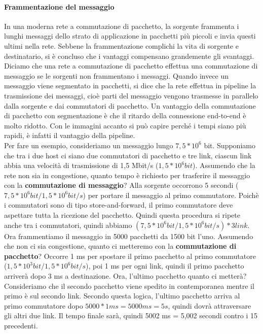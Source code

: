 \documentclass[11pt,a4paper]{article}
\begin{document}
\paragraph{Frammentazione del messaggio}
In una moderna rete a commutazione di pacchetto, la sorgente frammenta i lunghi messaggi dello strato di applicazione in pacchetti più piccoli e invia questi ultimi nella rete. Sebbene la frammentazione complichi la vita di sorgente e destinatario, si è concluso che i vantaggi compensano grandemente gli svantaggi.
Diciamo che una rete a commutazione di pacchetto effettua una commutazione di messaggio se le sorgenti non frammentano i messaggi.
Quando invece un messaggio viene segmentato in pacchetti, si dice che la rete effettua in pipeline la trasmissione dei messaggi, cioè parti del messaggio vengono trasmesse in parallelo dalla sorgente e dai commutatori di pacchetto.
Un vantaggio della commutazione di pacchetto con segmentazione è che il ritardo della connessione end-to-end è molto ridotto. Con le immagini accanto si può capire perché i tempi siano più rapidi, è infatti il vantaggio della pipeline. \\
Per fare un esempio, consideriamo un messaggio lungo $7,5 * 10^{6}$ bit. Supponiamo che tra i due host ci siano due commutatori di pacchetto e tre link, ciascun link abbia una velocità di trasmissione di 1,5 Mbit/s ($1,5 * 10^{6} bit$). Assumendo che la rete non sia in congestione, quanto tempo è richiesto per trasferire il messaggio con la \textbf{commutazione di messaggio}? Alla sorgente occorrono 5 secondi ($7,5 * 10^{6} bit / 1,5 * 10^{6} bit/s$) per portare il messaggio al primo commutatore. Poichè i commutatori sono di tipo store-and-forward, il primo commutatore deve aspettare tutta la ricezione del pacchetto. Quindi questa procedura si ripete anche tra i commutatori, quindi abbiamo $(7,5 * 10^{6} bit / 1,5 * 10^{6} bit/s)*3 link$. \\
Ora frammentiamo il messaggio in 5000 pacchetti da 1500 bit l'uno. Assumendo che non ci sia congestione, quanto ci metteremo con la \textbf{commutazione di pacchetto}? Occorre 1 ms per spostare il primo pacchetto al primo commutatore ($1,5 * 10^{3} bit / 1,5 * 10^{6} bit/s$), poi 1 ms per ogni link, quindi il primo pacchetto arriverà dopo 3 ms a destinazione. Ora, l'ultimo pacchetto quanto ci metterà? Consideriamo che il secondo pacchetto viene spedito in contemporanea mentre il primo è sul secondo link. Secondo questa logica, l'ultimo pacchetto arriva al primo commutatore dopo $5000 * 1 ms = 5000 ms = 5 s$, quindi dovrà attraversare gli altri due link. Il tempo finale sarà, quindi 5002 ms = 5,002 secondi contro i 15 precedenti. \\
\end{document}
